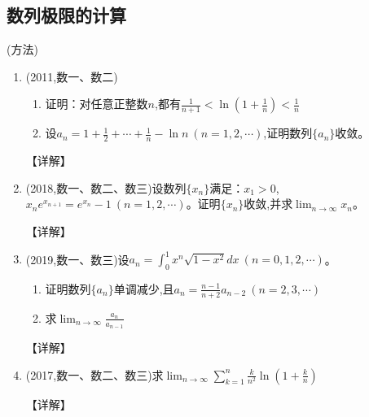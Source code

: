 \documentclass[12pt, a4paper, oneside, UTF8]{ctexbook}
\begin{document}
\subsection{数列极限的计算}
\begin{remark}(方法)
\end{remark}
\begin{enumerate}[label=\arabic*.,start=15]
    \item  (2011,数一、数二)
    \begin{enumerate}[label=(\roman*)]
        \item 证明：对任意正整数$n$,都有$\frac{1}{n+1}<\ln\left(1+\frac{1}{n}\right)<\frac{1}{n}$
        \item 设$a_n=1+\frac{1}{2}+\cdots+\frac{1}{n}-\ln n\ (n=1,2,\cdots)$,证明数列$\{a_n\}$收敛。
    \end{enumerate}
    
    \begin{solution}
    【详解】
    \end{solution}
    
    \item  (2018,数一、数二、数三)设数列$\{x_n\}$满足：$x_1>0$,$x_ne^{x_{n+1}}=e^{x_n}-1\ (n=1,2,\cdots)$。证明$\{x_n\}$收敛,并求$\lim_{n\to\infty}x_n$。
    
    \begin{solution}
    【详解】
    \end{solution}
    
    \item  (2019,数一、数三)设$a_n=\int_0^1 x^n\sqrt{1-x^2}dx\ (n=0,1,2,\cdots)$。
    \begin{enumerate}[label=(\roman*)]
        \item 证明数列$\{a_n\}$单调减少,且$a_n=\frac{n-1}{n+2}a_{n-2}\ (n=2,3,\cdots)$
        \item 求$\lim_{n\to\infty}\frac{a_n}{a_{n-1}}$
    \end{enumerate}
    
    \begin{solution}
    【详解】
    \end{solution}
    
    \item  (2017,数一、数二、数三)求$\lim_{n\to\infty}\sum_{k=1}^n\frac{k}{n^2}\ln\left(1+\frac{k}{n}\right)$
    
    \begin{solution}
    【详解】
    \end{solution}
\end{enumerate}
\end{document}
